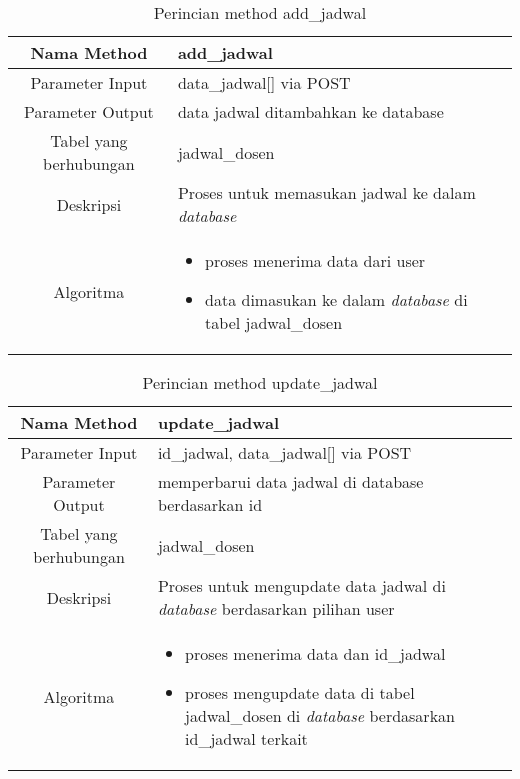 \begin{center}
\begin{table}[H]
\caption{Perincian method add\_jadwal}
\begin{tabular}{|c|p{11cm}|}
\hline
Nama Method 	& 	add\_jadwal 	\\
\hline
Parameter Input & data\_jadwal[] via POST \\
\hline
Parameter Output & data jadwal ditambahkan ke database \\
\hline
Tabel yang berhubungan & jadwal\_dosen \\
\hline
Deskripsi	& Proses untuk memasukan jadwal ke dalam \textit{database} \\
\hline
Algoritma	& \begin{itemize}
				\item proses menerima data dari user
				\item data dimasukan ke dalam \textit{database} di tabel jadwal\_dosen
				\end{itemize} \\
\hline
\end{tabular}
\end{table}
\end{center}


\begin{center}
\begin{table}[H]
\caption{Perincian method update\_jadwal}
\begin{tabular}{|c|p{11cm}|}
\hline
Nama Method 	& 	update\_jadwal 	\\
\hline
Parameter Input & id\_jadwal, data\_jadwal[] via POST \\
\hline
Parameter Output & memperbarui data jadwal di database berdasarkan id \\
\hline
Tabel yang berhubungan & jadwal\_dosen \\
\hline
Deskripsi	& Proses untuk mengupdate data jadwal di \textit{database} berdasarkan pilihan user\\
\hline
Algoritma	& \begin{itemize}
				\item proses menerima data dan id\_jadwal
				\item proses mengupdate data di tabel jadwal\_dosen di \textit{database} berdasarkan id\_jadwal terkait
				\end{itemize} \\
\hline
\end{tabular}
\end{table}
\end{center}


